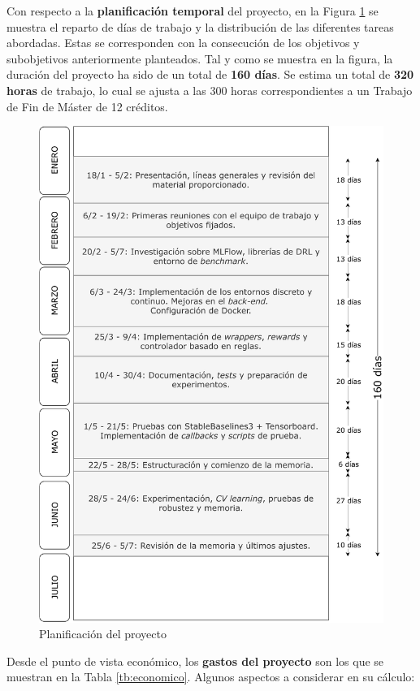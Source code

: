 Con respecto a la \textbf{planificación temporal} del proyecto, en la Figura \ref{fig:planning} se muestra el reparto de días de trabajo y la distribución de las diferentes tareas abordadas. Estas se corresponden con la consecución de los objetivos y subobjetivos anteriormente planteados. Tal y como se muestra en la figura, la duración del proyecto ha sido de un total de \textbf{160 días}. Se estima un total de \textbf{320 horas} de trabajo, lo cual se ajusta a las 300 horas correspondientes a un Trabajo de Fin de Máster de 12 créditos.

\begin{figure}
    \centering
    \includegraphics[width=\textwidth]{imagenes/planning.pdf}
    \caption{Planificación del proyecto}
    \label{fig:planning}
\end{figure}

Desde el punto de vista económico, los \textbf{gastos del proyecto} son los que se muestran en la Tabla \ref{tb:economico}. Algunos aspectos a considerar en su cálculo:

